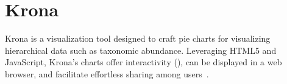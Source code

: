 \section{Krona}\label{sec:Krona}
Krona is a visualization tool designed to craft pie charts for visualizing hierarchical data such as taxonomic abundance. Leveraging HTML5 and JavaScript, Krona's charts offer interactivity (), can be displayed in a web browser, and facilitate effortless sharing among users~\cite{ondov_interactive_2011}.